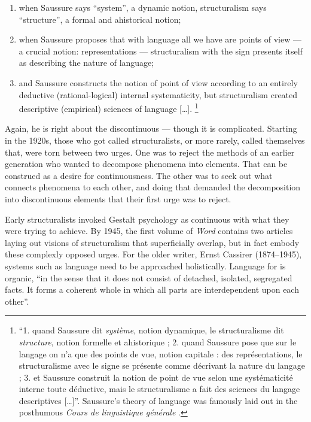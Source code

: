 \documentclass[output=paper]{langscibook}
\begin{document}
\begin{enumerate}
    \item when Saussure says ``system'', a dynamic notion, structuralism says ``structure'', a formal and ahistorical notion;
    \item when Saussure proposes that with language all we have are points of view — a crucial notion: representations — structuralism with the sign presents itself as describing the nature of language;
    \item and Saussure constructs the notion of point of view according to an entirely deductive (rational-logical) internal systematicity, but structuralism created descriptive (empirical) sciences of language […]. \linebreak\citep[20]{Meschonnic2009}\footnote{``1. quand Saussure dit \emph{système}, notion dynamique, le structuralisme dit \emph{structure}, notion formelle et ahistorique ; 2. quand Saussure pose que sur le langage on n'a que des points de vue, notion capitale : des représentations, le structuralisme avec le signe se présente comme décrivant la nature du langage ; 3. et Saussure construit la notion de point de vue selon une systématicité interne toute déductive, mais le structuralisme a fait des sciences du langage descriptives […]''. Saussure's theory of language was famously laid out in the posthumous \emph{Cours de linguistique générale} \citep{Saussure19221916}.}
\end{enumerate}

Again, he is right about the discontinuous — though it is complicated. Starting in the 1920s, those who got called structuralists, or more rarely, called themselves that, were torn between two urges. One was to reject the methods of an earlier generation who wanted to decompose phenomena into elements. That can be construed as a desire for continuousness. The other was to seek out what connects phenomena to each other, and doing that demanded the decomposition into discontinuous elements that their first urge was to reject.

Early structuralists invoked Gestalt psychology as continuous with what they were trying to achieve. By 1945, the first volume of \emph{Word} contains two articles laying out visions of structuralism that superficially overlap, but in fact embody these complexly opposed urges. For the older writer, Ernst Cassirer (1874--1945), systems such as language need to be approached holistically. Language for \citet[110]{Cassirer1945} is organic, ``in the sense that it does not consist of detached, isolated, segregated facts. It forms a coherent whole in which all parts are interdependent upon each other''.
\end{document}
